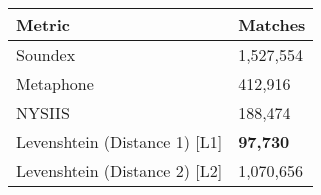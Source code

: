 \begin{tabular}{ll}
    Metric & Matches \\
    \hline
    Soundex     & 1,527,554 \\
    Metaphone   & 412,916 \\
    NYSIIS      & 188,474 \\
    \hline
    Levenshtein (Distance 1) [L1] & \textbf{97,730} \\
    Levenshtein (Distance 2) [L2] & 1,070,656
\end{tabular}